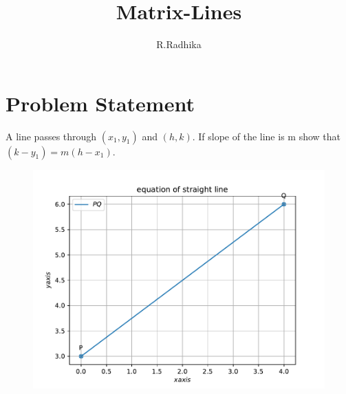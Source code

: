 \documentclass[journal,12pt,twocolumn]{IEEEtran}
\title{
Matrix-Lines
}
\author{R.Radhika}
\begin{document}
\maketitle
\tableofcontents
\bigskip
\section{Problem Statement}
\fi
A line passes through $(x_1,y_1)$ and $(h,k)$. If slope of the line is m show that $(k-y_1)=m(h-x_1)$.
\\
\solution 
	\begin{figure}[!ht]
		\centering
 \includegraphics[width=\columnwidth]{chapters/11/10/1/12/figs/figure.pdf}
		\caption{}
		\label{fig:11/10/1/12}
  	\end{figure}
\iffalse
\end{document}
